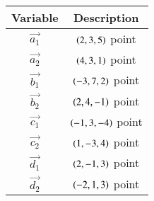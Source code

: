 \begin{tabular}[12pt]{ |c| c|}
    \hline
    \textbf{Variable} & \textbf{Description}\\ 
    \hline
	$\vec{a_1}$ & $\left(2,3,5\right)$ point\\
    \hline
	$\vec{a_2}$ & $\left(4,3,1\right)$ point\\
    \hline
	$\vec{b_1}$ & $\left(-3,7,2\right)$ point\\
	\hline
	$\vec{b_2}$ & $\left(2,4,-1\right)$ point\\
	\hline
	$\vec{c_1}$ & $\left(-1,3,-4\right)$ point\\
    \hline
	$\vec{c_2}$ & $\left(1,-3,4\right)$ point\\
    \hline
	$\vec{d_1}$ & $\left(2,-1,3\right)$ point\\
	\hline
	$\vec{d_2}$ & $\left(-2,1,3\right)$ point\\
	\hline

    \end{tabular}
